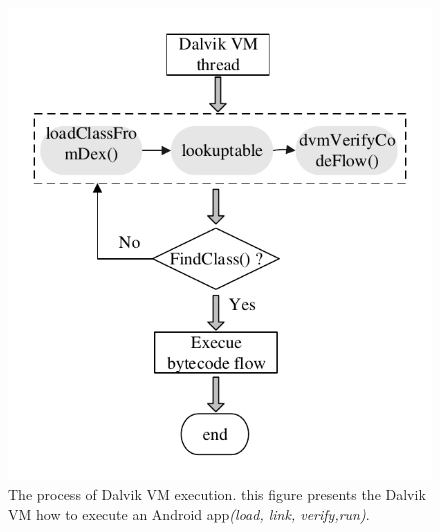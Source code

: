 \begin{figure}[!tbp]
  \centering
  \includegraphics[width=0.8\columnwidth]{fig/fig3.pdf}
  \caption{The process of Dalvik VM execution. this figure presents the Dalvik VM how to execute an Android app\emph{(load, link, verify,run)}.}
  \label{fig:Figure 3}
\end{figure}





